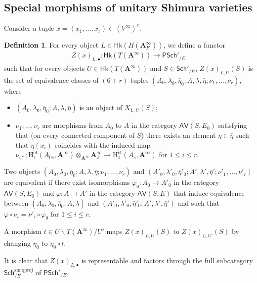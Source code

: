 \documentclass[12pt]{amsart}
\numberwithin{equation}{section}
\theoremstyle{plain}
\theoremstyle{definition}
\newtheorem{definition}[proposition]{Definition}
\theoremstyle{remark}
\renewcommand{\b}[1]{\mathbf{#1}}
\renewcommand{\r}[1]{\mathrm{#1}}
\renewcommand{\sf}[1]{\mathsf{#1}}
\renewcommand{\(}{\left(}
\renewcommand{\)}{\right)}
\renewcommand{\leq}{\leqslant}
\newcommand{\bA}{\b A}
\newcommand{\rH}{\r H}
\newcommand{\sfP}{\sf P}
\newcommand{\et}{{\acute{\r{e}}\r{t}}}
\newcommand{\smq}{\r{sm.qproj}}
\newcommand{\Sch}{\sf{Sch}}
\newcommand{\AV}{\sf{AV}}
\newcommand{\Hk}{\sf{Hk}}
\begin{document}
\subsection{Special morphisms of unitary Shimura varieties}
\label{ss:speical_morphism}

Consider a tuple $x=(x_1,\dots,x_r)\in(V^\infty)^r$.



\begin{definition}\label{de:special_morphism}
For every object $L\in\Hk(H(\bA_F^\infty))$, we define a functor
\begin{align*}
Z(x)_{L,\bullet}\colon\Hk(T(\bA^\infty))\to\sfP\Sch'_{/E}
\end{align*}
such that for every objects $U\in\Hk(T(\bA^\infty))$ and $S\in\Sch'_{/E}$, $Z(x)_{L,U}(S)$ is the set of equivalence classes of $(6+r)$-tuples $(A_0,\lambda_0,\bar\eta_0;A,\lambda,\bar\eta;\nu_1,\dots,\nu_r)$, where
\begin{itemize}
  \item $(A_0,\lambda_0,\bar\eta_0;A,\lambda,\bar\eta)$ is an object of $X_{L,U}(S)$;

  \item $\nu_1,\dots,\nu_r$ are morphisms from $A_0$ to $A$ in the category $\AV(S,E_0)$ satisfying that (on every connected component of $S$) there exists an element $\eta\in\bar\eta$ such that $\eta(x_i)$ coincides with the induced map $\nu_{i*}\colon\rH_1^{\et}(A_{0s},\bA^\infty)\otimes_{\bA^\infty}\bA_F^\infty\to\rH_1^{\et}(A_s,\bA^\infty)$ for $1\leq i\leq r$.
\end{itemize}
Two objects $(A_0,\lambda_0,\bar\eta_0;A,\lambda,\bar\eta;\nu_1,\dots,\nu_r)$ and $(A'_0,\lambda'_0,\bar\eta'_0;A',\lambda',\bar\eta';\nu'_1,\dots,\nu'_r)$ are equivalent if there exist isomorphisms $\varphi_0\colon A_0\to A'_0$ in the category $\AV(S,E_0)$ and $\varphi\colon A\to A'$ in the category $\AV(S,E)$ that induce equivalence between $(A_0,\lambda_0,\bar\eta_0;A,\lambda)$ and $(A'_0,\lambda'_0,\bar\eta'_0;A',\lambda',\bar\eta')$ and such that $\varphi\circ\nu_i=\nu'_i\circ\varphi_0$ for $1\leq i\leq r$.

A morphism $t\in U\backslash T(\bA^\infty)/U'$ maps $Z(x)_{L,U}(S)$ to $Z(x)_{L,U'}(S)$ by changing $\bar\eta_0$ to $\bar\eta_0\circ t$.
\end{definition}

It is clear that $Z(x)_{L,\bullet}$ is representable and factors through the full subcategory $\Sch^\smq_{/E}$ of $\sfP\Sch'_{/E}$.
\end{document}
